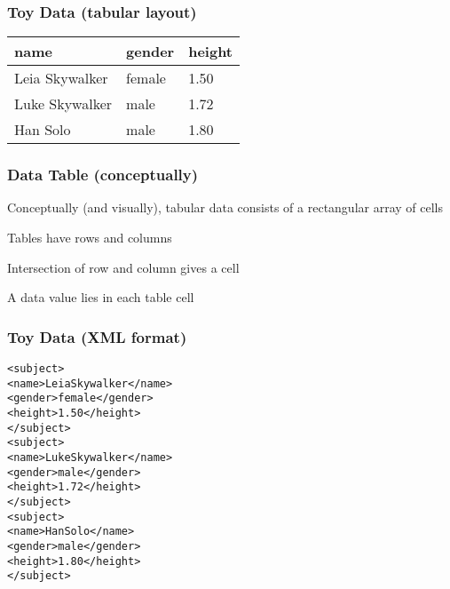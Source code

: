 \documentclass[12pt]{beamer}\usepackage[]{graphicx}\usepackage[]{color}
\makeatletter
\newenvironment{kframe}{%
 \def\at@end@of@kframe{}%
 \ifinner\ifhmode%
  \def\at@end@of@kframe{\end{minipage}}%
  \begin{minipage}{\columnwidth}%
 \fi\fi%
 \def\FrameCommand##1{\hskip\@totalleftmargin \hskip-\fboxsep
 \colorbox{shadecolor}{##1}\hskip-\fboxsep
     \hskip-\linewidth \hskip-\@totalleftmargin \hskip\columnwidth}%
 \MakeFramed {\advance\hsize-\width
   \@totalleftmargin\z@ \linewidth\hsize
   \@setminipage}}%
 {\par\unskip\endMakeFramed%
 \at@end@of@kframe}
\newenvironment{knitrout}{}{} %
\makeatother
\begin{document}

\begin{frame}[fragile]
\frametitle{Toy Data (tabular layout)}

\begin{center}
 \begin{tabular}{| l | l | l |}
  \hline
name & gender & height \\
  \hline
Leia Skywalker & female & 1.50 \\
  \hline
Luke Skywalker & male & 1.72 \\
  \hline
Han Solo & male & 1.80 \\
  \hline
 \end{tabular}
\end{center}

\end{frame}


\begin{frame}
\frametitle{Data Table (conceptually)}

\bbi
  \item Conceptually (and visually), tabular data consists of a rectangular array of cells
  \item Tables have rows and columns
  \item Intersection of row and column gives a cell
  \item A data value lies in each table cell
\ei

\end{frame}


\begin{frame}
\begin{center}
\Large{}

\end{center}
\end{frame}


\begin{frame}[fragile]
\frametitle{Toy Data (XML format)}

\begin{knitrout}\footnotesize
{}\color{fgcolor}\begin{kframe}
\begin{alltt}
<subject>
  <name>Leia Skywalker</name>
  <gender>female</gender>
  <height>1.50</height>
</subject>
<subject>
  <name>Luke Skywalker</name>
  <gender>male</gender>
  <height>1.72</height>
</subject>
<subject>
  <name>Han Solo</name>
  <gender>male</gender>
  <height>1.80</height>
</subject>
\end{alltt}
\end{kframe}
\end{knitrout}

\end{frame}
\end{document}
